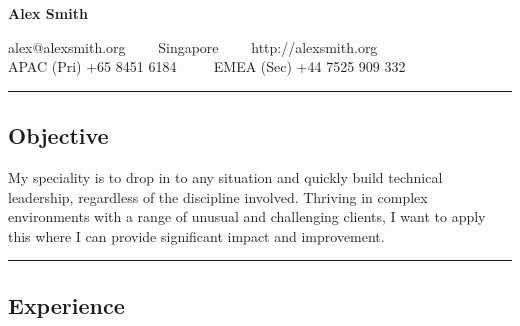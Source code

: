 \documentclass[10pt,a4paper]{article}
\begin{document}
\begin{center}
{\LARGE \textbf{Alex Smith}}


alex@alexsmith.org\ \ \textbullet
\ \ Singapore\ \ \textbullet
\ \ http://alexsmith.org
\\
APAC (Pri) +65 8451 6184 \ \ \textbullet
\ \ EMEA (Sec) +44 7525 909 332
\end{center}

\hrule
\vspace{-0.4em}
\subsection*{Objective}
    My speciality is to drop in to any situation and quickly build technical leadership, regardless of the discipline involved. Thriving in complex environments with a range of unusual and challenging clients, I want to apply this where I can provide significant impact and improvement.
    \\

\hrule
\vspace{-0.4em}
\subsection*{Experience}
\end{document}
